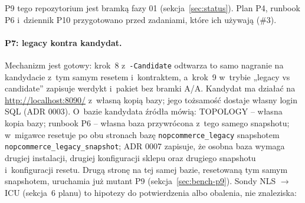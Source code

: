 P9 tego repozytorium jest bramką fazy 01 (sekcja~\ref{sec:status}). Plan P4, runbook P6
i~dziennik P10 przygotowano przed zadaniami, które ich używają (\#3).

\paragraph{P7: legacy kontra kandydat.} Mechanizm jest gotowy: krok~8 z~\texttt{-Candidate}
odtwarza to samo nagranie na kandydacie z~tym samym resetem i~kontraktem, a~krok~9
w~trybie „legacy vs candidate” zapisuje werdykt i~pakiet bez bramki A/A. Kandydat ma
działać na \url{http://localhost:8090/} z~własną kopią bazy; jego tożsamość dostaje własny
login SQL (ADR 0003). O~bazie kandydata źródła mówią: TOPOLOGY -- własna kopia bazy; runbook
P6 -- własna baza przywrócona z~tego samego snapshotu; 
w~migawce resetuje po obu stronach bazę \texttt{nopcommerce\_legacy} snapshotem
\texttt{nopcommerce\_legacy\_snapshot}; ADR 0007 zapisuje, że osobna baza wymaga drugiej
instalacji, drugiej konfiguracji sklepu oraz drugiego snapshotu i~konfiguracji resetu. Drugą
stronę na tej samej bazie, resetowaną tym samym snapshotem, uruchamia już mutant P9
(sekcja~\ref{sec:bench-p9}). Sondy NLS $\rightarrow$ ICU (sekcja~6 planu) to hipotezy do
potwierdzenia albo obalenia, nie znaleziska:

